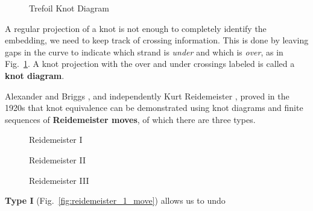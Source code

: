         \begin{figure}
            \centering
            \caption{Trefoil Knot Diagram}
            \label{fig:trefoil_knot_001}
        \end{figure}
        A regular projection of a knot is not enough to completely identify the
        embedding, we need to keep track of crossing information. This is done
        by leaving gaps in the curve to indicate which strand is \textit{under}
        and which is \textit{over}, as in Fig.~\ref{fig:trefoil_knot_001}. A
        knot projection with the over and under crossings labeled is called a
        \textbf{knot diagram}.
        \par\hfill\par
        Alexander and Briggs \cite{AlexanderBriggs1926}, and independently
        Kurt Reidemeister \cite{Reidemeister1927}, proved in the 1920s that
        knot equivalence can be demonstrated using knot diagrams and finite
        sequences of \textbf{Reidemeister moves}, of which there are three
        types.
        \par\hfill\par
        \begin{figure}
            \centering
            \begin{minipage}[b]{0.4\textwidth}
                \centering
                \caption{Reidemeister I}
                \label{fig:reidemeister_1_move}
            \end{minipage}
            \hfill
            \begin{minipage}[b]{0.5\textwidth}
                \centering
                \caption{Reidemeister II}
                \label{fig:reidemeister_2_move}
            \end{minipage}
        \end{figure}
        \begin{figure}
            \centering
            \caption{Reidemeister III}
            \label{fig:reidemeister_3_move}
        \end{figure}
        \textbf{Type I} (Fig.~\ref{fig:reidemeister_1_move}) allows us to undo
